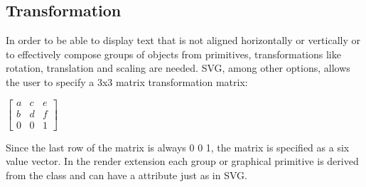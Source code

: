 


\subsection{Transformation}

In order to be able to display text that is not aligned horizontally or 
vertically or to effectively compose groups of objects from primitives, 
transformations like rotation, translation and scaling are needed. SVG, among 
other options, allows the user to specify a 3x3 matrix transformation matrix: 

\hspace*{0.4cm}
\begin{center}
\begin{math}\left[ \begin{array}{ccc} a & c & e \\ b & d & f \\ 0 & 0 & 1\end{array}\right]\end{math}
\end{center}
\hspace*{0.4cm}

Since the last row of the matrix is always 0 0 1, the matrix is specified as a 
six value vector. In the render extension each group or graphical 
primitive is derived from the class \TransformationTwoD and can have a  attribute just as in SVG.

